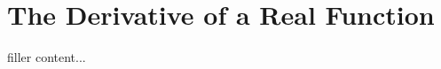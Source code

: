 \documentclass[../../templates/section]{subfiles}
\begin{document}
\section{The Derivative of a Real Function}\label{sec:the-derivative-of-a-real-function}

filler content...
\end{document}
